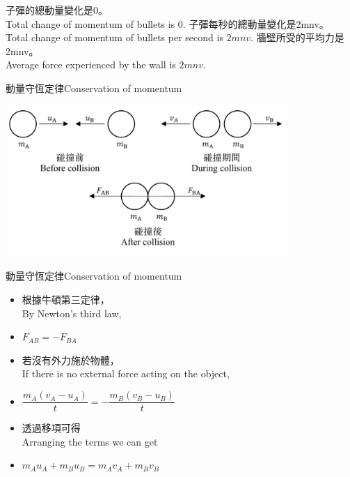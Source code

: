 \documentclass[13pt]{beamer}
\begin{document}
\begin{eg}
    \begin{tasks}
        \task [(1)] 子彈的總動量變化是$0$。\\Total change of momentum of bullets is $0$.
        \task [(2)] 子彈每秒的總動量變化是2mnv。\\Total change of momentum of bullets per second is $2mnv$.
        \task [(3)] 牆壁所受的平均力是2mnv。\\Average force experienced by the wall is $2mnv$.
    \end{tasks}
\end{eg}

\begin{frame}{動量守恆定律Conservation of momentum}
    \par{\par\centering
        \includegraphics[width=0.8\textwidth]{assets/02c41700.png}
        \par}
\end{frame}
\begin{frame}{動量守恆定律Conservation of momentum}
    \begin{itemize}
        \item 根據牛頓第三定律，\\By Newton's third law,
        \item []$F_{AB}=-F_{BA}$
        \item 若沒有外力施於物體，\\If there is no external force acting on the object,
        \item []$\dfrac{m_A(v_A-u_A)}{t}=-\dfrac{m_B(v_B-u_B)}{t}$
        \item 透過移項可得\\Arranging the terms we can get
        \item []$m_Au_A+m_Bu_B=m_Av_A+m_Bv_B$
    \end{itemize}
\end{frame}
\end{document}
